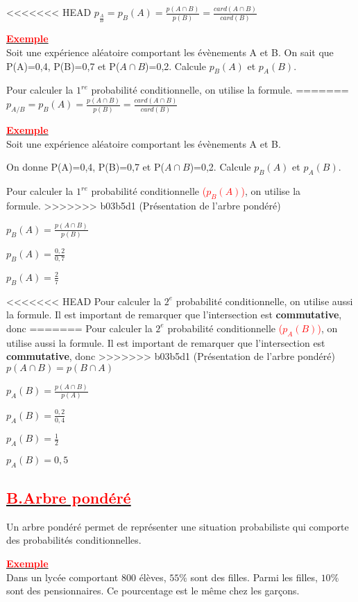 \documentclass[12pt]{article}
\begin{document}
<<<<<<< HEAD
$p_{\frac{A}{B}}=p_{B}(A)=\frac{p(A\cap B)}{p(B)}=\frac{card(A\cap B)}{card(B)}$

\underline{\textbf{\textcolor{red}{Exemple}}}\\
Soit une expérience aléatoire comportant les évènements A et B. On sait que
P(A)=0,4,  P(B)=0,7 et P($A\cap B$)=0,2. Calcule $p_{B}(A)$ et $p_{A}(B)$.

Pour calculer la $1^{re}$ probabilité conditionnelle, on utilise la formule.
=======
$p_{A/B}=p_{B}(A)=\frac{p(A\cap B)}{p(B)}=\frac{card(A\cap B)}{card(B)}$

\underline{\textbf{\textcolor{red}{Exemple}}}\\
Soit une expérience aléatoire comportant les évènements A et B.

On donne
P(A)=0,4,  P(B)=0,7 et P($A\cap B$)=0,2. Calcule $p_{B}(A)$ et $p_{A}(B)$.

Pour calculer la $1^{re}$ probabilité conditionnelle  \textcolor{red}{($p_{B}(A)$)}, on utilise la\\ formule.
>>>>>>> b03b5d1 (Présentation de l'arbre pondéré)

$p_{B}(A)=\frac{p(A\cap B)}{p(B)}$

$p_{B}(A)=\frac{0,2}{0,7}$

$p_{B}(A)=\frac{2}{7}$

<<<<<<< HEAD
Pour calculer la $2^{e}$ probabilité conditionnelle, on utilise aussi la formule. Il est important de remarquer que l’intersection est \textbf{commutative}, donc 
=======
Pour calculer la $2^{e}$ probabilité conditionnelle \textcolor{red}{($p_{A}(B)$)}, on utilise aussi la formule. Il est important de remarquer que l’intersection est \textbf{commutative}, donc 
>>>>>>> b03b5d1 (Présentation de l'arbre pondéré)
$p(A\cap B)=p(B\cap A)$

$p_{A}(B)=\frac{p(A\cap B)}{p(A)}$

$p_{A}(B)=\frac{0,2}{0,4}$

$p_{A}(B)=\frac{1}{2}$

$p_{A}(B)=0,5$
\subsection*{\underline{\textbf{\textcolor{red}{B.Arbre pondéré}}}}
Un arbre pondéré permet de représenter une situation probabiliste qui comporte des probabilités conditionnelles.

\underline{\textbf{\textcolor{red}{Exemple }}}\\
Dans un lycée comportant 800 élèves, $55\%$ sont des filles. Parmi les filles, $10\%$ sont des pensionnaires. Ce pourcentage est le même chez les garçons.
\end{document}
